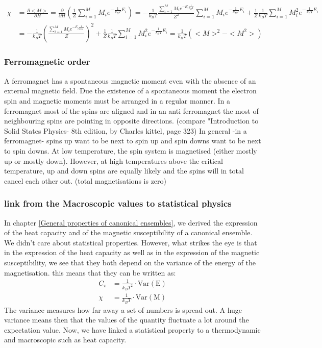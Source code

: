 \documentclass[10pt,a4paper]{article}
\begin{document}
\begin{align}
\chi &=\frac{\partial <M>}{\partial H} = \frac{\partial}{\partial H} \left( \frac{1}{Z }\sum_{i=1}^{M}M_i e ^{ - \frac {1}{k_BT} E_i}\right) = -\frac{1}{k_B T } \frac{\sum_{i=1}^{M} M_i e^{-E_i \frac{1}{k_BT}}}{ Z^2}\sum_{i=1}^{M}M_i e ^{ - \frac {1}{k_BT} E_i} +\frac{1}{Z}\frac{1}{k_BT}\sum_{i=1}^{M}M_i^2 e ^{ - \frac {1}{k_BT} E_i} \\
 &= -\frac{1}{k_B T} \left( \frac{\sum_{i=1}^{M} M_i e^{-E_i \frac{1}{k_BT}}}{ Z} \right)^2 +\frac{1}{Z}\frac{1}{k_BT}\sum_{i=1}^{M}M_i^2 e ^{ - \frac {1}{k_BT} E_i} = \frac{1}{k_B T } \left( <M>^2 - <M^2> \right)
\end{align}


\subsubsection{Ferromagnetic order}
A ferromagnet has a spontaneous magnetic moment even with the absence of an external magnetic field. Due the existence of a spontaneous moment the electron spin and magnetic moments must be arranged in a regular manner.
In a ferromagnet most of the spins are aligned and in an  anti ferromagnet the most of neighbouring spins are pointing in opposite directions.
(compare "Introduction to Solid States Physics- 8th edition, by Charles kittel, page 323)
In general -in a ferromagnet- spins up want to be next to spin up and spin downs want to be next to spin downs. At low temperature, the spin system is magnetised (either mostly up or mostly down). However, at high temperatures above the critical temperature, up and down spins are equally likely and the spins will in total cancel each other out. (total magnetisations is zero)

\subsubsection{link from the Macroscopic values to statistical physics}
In chapter \ref{General properties of canonical ensembles}, we derived the expression of the heat capacity and of the magnetic susceptibility of a canonical ensemble. We didn't care about statistical properties. However, what strikes the eye is that in the expression of the heat capacity as well as in the expression of the magnetic susceptibility, we see that they both depend on the variance of the energy of the magnetisation. this means that they can be written as:
\begin{align}
C_v &= \frac{1}{k_B T^2}\cdot \mathrm{Var(E)}\\
\chi &= \frac{1}{k_B T} \cdot \mathrm{Var(M)}
\end{align}
The variance measures how far away a set of numbers is spread out. A huge variance means then that the values of the quantity fluctuate a lot around the expectation value.  Now, we have linked a statistical property to a thermodynamic and macroscopic such as heat capacity. 
\end{document}

